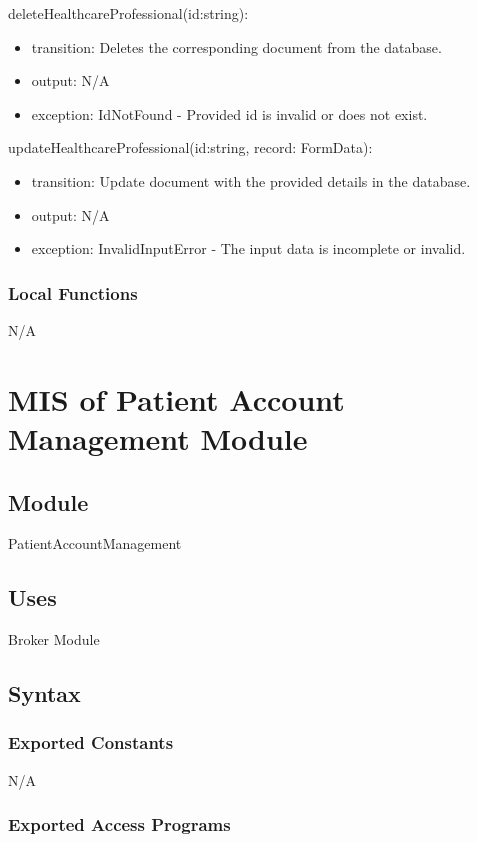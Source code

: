 \documentclass[12pt, titlepage]{article}
\begin{document}
\noindent deleteHealthcareProfessional(id:string):
\begin{itemize}
\item transition: Deletes the corresponding document from the database.
\item output: N/A
\item exception: IdNotFound - Provided id is invalid or does not exist.
\end{itemize}

\noindent updateHealthcareProfessional(id:string, record: FormData):
\begin{itemize}
\item transition: Update document with the provided details in the database.
\item output: N/A
\item exception: InvalidInputError - The input data is incomplete or invalid.
\end{itemize}

\subsubsection{Local Functions}

N/A

\newpage

\section{MIS of Patient Account Management Module} \label{Module_PatientAccountManag}

\subsection{Module}
PatientAccountManagement

\subsection{Uses}
Broker Module\\

\subsection{Syntax}

\subsubsection{Exported Constants}
N/A

\subsubsection{Exported Access Programs}
\end{document}
